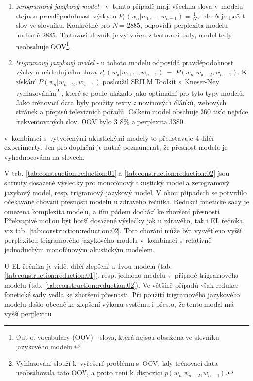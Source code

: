 \begin{enumerate}
  \item \textit{zerogramový jazykový model} - v~tomto případě mají všechna slova v~modelu stejnou pravděpodobnost výskytu $P_r(w_n|w_1,\dots,w_{n-1}) = \frac{1}{N}$, kde $N$ je počet slov ve slovníku. Konkrétně pro $N = 2885$, odpovídá perplexita modelu hodnotě $2885$. Testovací slovník je vytvořen z testovací sady, model tedy neobsahuje OOV\footnote{Out-of-vocabulary (OOV) - slova, která nejsou obsažena ve slovníku jazykového modelu.}.
  \item \textit{trigramový jazykový model} - u tohoto modelu odpovídá pravděpodobnost výskytu následujícího slova $P_r(w_n|w_1,\dots,w_{n-1})~=~P(w_n|w_{n-2}, w_{n-1})$. K získání $P(w_n|w_{n-2}, w_{n-1})$ posloužil SRILM Toolkit s~Kneser-Ney vyhlazováním\footnote{Vyhlazování slouží  k~vyřešení problému s~OOV, kdy trénovací data neobsahovala tato OOV, a proto není  k~dispozici $p(w_n|w_{n-2}, w_{n-1})$.} \cite{Stolcke2002}, které se podle \cite{Prazak2008} ukázalo jako optimální pro tyto typy modelů. Jako trénovací data byly použity texty z novinových článků, webových stránek a přepisů televizních pořadů. Celkem model obsahuje 360 tisíc nejvíce frekventovaných slov. OOV bylo $3,8 \%$ a perplexita $3380$.
\end{enumerate}

\noindent v~kombinaci s~vytvořenými akustickými modely to představuje 4 dílčí experimenty.
Jen pro doplnění je nutné poznamenat, že přesnost modelů je vyhodnocována na slovech.

V tab. \ref{tab:construction:reduction:01} a \ref{tab:construction:reduction:02} jsou shrnuty dosažené výsledky pro monofónový akustický model a zerogramový jazykový model, resp. trigramový jazykový model.
V obou případech se potvrdilo očekávané chování přesnosti modelu u zdravého řečníka.
Redukcí fonetické sady je omezena komplexita modelu, a tím pádem dochází ke zhoršení přesnosti.
Překvapivé mohou být horší dosažené výsledky jak u zdravého, tak i EL řečníka, viz tab. \ref{tab:construction:reduction:02}.
Toto chování může být vysvětleno vyšší perplexitou trigramového jazykového modelu v~kombinaci s~relativně jednoduchým monofónovým akustickým modelem.

U EL řečníka je vidět dílčí zlepšení u dvou modelů (tab. \ref{tab:construction:reduction:01}), resp. jednoho modelu v~případě trigramového modelu (tab. \ref{tab:construction:reduction:02}).
Ve většině případů však redukce fonetické sady vedla ke zhoršení přesnosti.
Při použití trigramového jazykového modelu došlo obecně ke zlepšení výkonu systému i přesto, že tento model má vyšší perplexitu.

